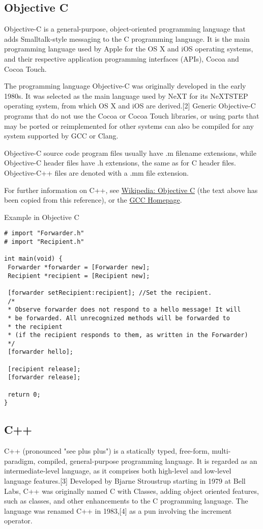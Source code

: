 \newpage
\subsection{Objective C}
Objective-C is a general-purpose, object-oriented programming language that adds Smalltalk-style messaging to the C programming language. It is the main programming language used by Apple for the OS X and iOS operating systems, and their respective application programming interfaces (APIs), Cocoa and Cocoa Touch.

\vpara
The programming language Objective-C was originally developed in the early 1980s. It was selected as the main language used by NeXT for its NeXTSTEP operating system, from which OS X and iOS are derived.[2] Generic Objective-C programs that do not use the Cocoa or Cocoa Touch libraries, or using parts that may be ported or reimplemented for other systems can also be compiled for any system supported by GCC or Clang.

\vpara
Objective-C source code program files usually have .m filename extensions, while Objective-C header files have .h extensions, the same as for C header files. Objective-C++ files are denoted with a .mm file extension.


\vpara
For further information on C++, see \href{http://en.wikipedia.org/wiki/Objective-C}{Wikipedia: Objective C} (the text above has been copied from this reference), or the  \href{http://gcc.gnu.org/}{GCC Homepage}.



\vpara
Example in Objective C

\begin{lstlisting}
# import "Forwarder.h"
# import "Recipient.h"
 
int main(void) {
 Forwarder *forwarder = [Forwarder new];
 Recipient *recipient = [Recipient new];
 
 [forwarder setRecipient:recipient]; //Set the recipient.
 /*
 * Observe forwarder does not respond to a hello message! It will
 * be forwarded. All unrecognized methods will be forwarded to
 * the recipient
 * (if the recipient responds to them, as written in the Forwarder)
 */
 [forwarder hello];
 
 [recipient release];
 [forwarder release];
 
 return 0;
}
\end{lstlisting}


\newpage
\subsection{C++}
C++ (pronounced "see plus plus") is a statically typed, free-form, multi-paradigm, compiled, general-purpose programming language. It is regarded as an intermediate-level language, as it comprises both high-level and low-level language features.[3] Developed by Bjarne Stroustrup starting in 1979 at Bell Labs, C++ was originally named C with Classes, adding object oriented features, such as classes, and other enhancements to the C programming language. The language was renamed C++ in 1983,[4] as a pun involving the increment operator.

